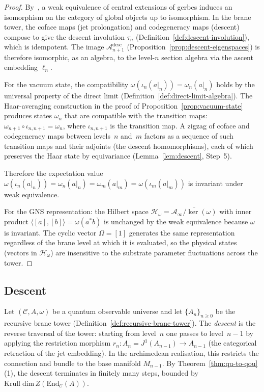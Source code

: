 \begin{proof}
By~\cite[Theorem~1.1]{yekutieli2010}, a weak equivalence of central
extensions of gerbes induces an isomorphism on the category of global
objects up to isomorphism.  In the brane tower, the coface maps (jet
prolongation) and codegeneracy maps (descent) compose to give the descent
involution $\tau_n$ (Definition~\ref{def:descent-involution}), which is
idempotent.  The image $\mathcal{A}_{n+1}^{\mathrm{desc}}$
(Proposition~\ref{prop:descent-eigenspaces}) is therefore isomorphic, as
an algebra, to the level-$n$ section algebra via the ascent embedding
$\ell_n$.

For the vacuum state, the compatibility
$\omega(\iota_n(a|_n)) = \omega_n(a|_n)$ holds by the universal property
of the direct limit (Definition~\ref{def:direct-limit-algebra}).  The
Haar-averaging construction in the proof of
Proposition~\ref{prop:vacuum-state} produces states $\omega_n$ that are
compatible with the transition maps:
$\omega_{n+1} \circ \iota_{n,n+1} = \omega_n$, where
$\iota_{n,n+1}$ is the transition map.  A zigzag of coface and
codegeneracy maps between levels~$n$ and~$m$ factors as a sequence of
such transition maps and their adjoints (the descent homomorphisms),
each of which preserves the Haar state by equivariance
(Lemma~\ref{lem:descent}, Step~5).

Therefore the expectation value
$\omega(\iota_n(a|_n)) = \omega_n(a|_n) = \omega_m(a|_m) =
\omega(\iota_m(a|_m))$
is invariant under weak equivalence.

For the GNS representation: the Hilbert space
$\mathcal{H}_\omega = \overline{\mathcal{A}_\infty / \ker(\omega)}$ with
inner product $\langle [a], [b] \rangle = \omega(a^* b)$ is unchanged by
the weak equivalence because $\omega$ is invariant.  The cyclic vector
$\Omega = [1]$ generates the same representation regardless of the brane
level at which it is evaluated, so the physical states (vectors in
$\mathcal{H}_\omega$) are insensitive to the substrate parameter
fluctuations across the tower.
\end{proof}


\subsection{Descent}
\label{ssec:descent}

\begin{definition}[Descent]
\label{def:descent}
Let $(\mathcal{C}, A, \omega)$ be a quantum observable universe and let
$\{A_n\}_{n \geq 0}$ be the recursive brane tower
(Definition~\ref{def:recursive-brane-tower}).  The \emph{descent} is the
reverse traversal of the tower: starting from level~$n$ one passes to
level~$n{-}1$ by applying the restriction morphism
$r_n \colon A_n = J^1(A_{n-1}) \to A_{n-1}$ (the categorical retraction
of the jet embedding).  In the archimedean realisation, this restricts
the connection and bundle to the base manifold $M_{n-1}$.
By Theorem~\ref{thm:qu-to-qou}(1), the descent terminates in finitely many
steps, bounded by $\mathrm{Krull\;dim}\, Z(\mathrm{End}_{\mathcal{C}}(A))$.
\end{definition}

